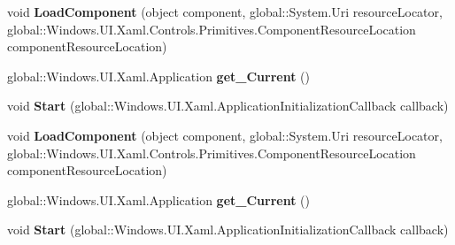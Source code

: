 \begin{DoxyCompactItemize}
\item 
\mbox{\label{interface_windows_1_1_u_i_1_1_xaml_1_1_i_application_statics_a634ebea47355c64e3699518f99f25457}} 
void {\bfseries Load\+Component} (object component, global\+::\+System.\+Uri resource\+Locator, global\+::\+Windows.\+U\+I.\+Xaml.\+Controls.\+Primitives.\+Component\+Resource\+Location component\+Resource\+Location)
\item 
\mbox{\label{interface_windows_1_1_u_i_1_1_xaml_1_1_i_application_statics_a129c53c72c044776a1ea808234dc4e0a}} 
global\+::\+Windows.\+U\+I.\+Xaml.\+Application {\bfseries get\+\_\+\+Current} ()
\item 
\mbox{\label{interface_windows_1_1_u_i_1_1_xaml_1_1_i_application_statics_ac5636b6eb0ad2b58bdaae989c1e1ae9b}} 
void {\bfseries Start} (global\+::\+Windows.\+U\+I.\+Xaml.\+Application\+Initialization\+Callback callback)
\item 
\mbox{\label{interface_windows_1_1_u_i_1_1_xaml_1_1_i_application_statics_a634ebea47355c64e3699518f99f25457}} 
void {\bfseries Load\+Component} (object component, global\+::\+System.\+Uri resource\+Locator, global\+::\+Windows.\+U\+I.\+Xaml.\+Controls.\+Primitives.\+Component\+Resource\+Location component\+Resource\+Location)
\item 
\mbox{\label{interface_windows_1_1_u_i_1_1_xaml_1_1_i_application_statics_a129c53c72c044776a1ea808234dc4e0a}} 
global\+::\+Windows.\+U\+I.\+Xaml.\+Application {\bfseries get\+\_\+\+Current} ()
\item 
\mbox{\label{interface_windows_1_1_u_i_1_1_xaml_1_1_i_application_statics_ac5636b6eb0ad2b58bdaae989c1e1ae9b}} 
void {\bfseries Start} (global\+::\+Windows.\+U\+I.\+Xaml.\+Application\+Initialization\+Callback callback)
\item 
\mbox{\label{interface_windows_1_1_u_i_1_1_xaml_1_1_i_application_statics_a634ebea47355c64e3699518f99f25457}} 

\end{DoxyCompactItemize}
